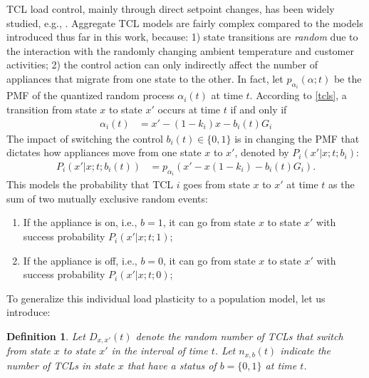 \documentclass[10pt]{IEEEtran}
\newtheorem{definition}[theorem]{Definition}
\begin{document}
TCL load control, mainly through direct setpoint changes, has been widely studied, e.g., \cite{6149125}. Aggregate TCL models are fairly complex compared to the models introduced thus far in this work, because: 1) state transitions are {\it random} due to the interaction with the randomly changing ambient temperature and customer activities; 2)
the control action can only indirectly affect the number of appliances that migrate from one state to the other.   
In fact, let  $p_{\alpha_i}(\alpha;t)$ be the PMF of the quantized random process $\alpha_i(t)$ at time $t$. 
According to \eqref{tcls}, a transition from state $x$ to state $x'$ occurs at time $t$ if and only if
\begin{align}\alpha_i(t)&=x' - (1- k_i) x  - b_i(t) G_i\end{align}
The impact of switching the control $b_i(t)\in\{0,1\}$ is in changing the PMF that dictates how appliances move from one state $x$ to $x'$, denoted by $P_i(x'|x;t;b_i)$:
\begin{align}
P_i(x'|x;t;b_i(t))&=p_{\alpha_i}\left(x'-x(1-k_i)-b_i(t) G_i\right).
\end{align}
This models the probability that TCL $i$ goes from state $x$ to $x'$ at time $t$ as the sum of two mutually exclusive random events:
\begin{enumerate}
\item If the appliance is on, i.e., $b=1$, it can go from state $x$ to state $x'$ with success probability $P_i(x'|x;t;1)$;
\item If the appliance is off, i.e., $b=0$, it can go from state $x$ to state $x'$ with success probability $P_i(x'|x;t;0)$;
\end{enumerate}



To generalize this individual load plasticity to a population model, let us introduce:
\begin{definition}{\it Let
$D_{x,x'}(t)$ denote the random number of TCLs that switch from state $x$ to state $x'$ in the interval of time $t$. 
Let $n_{x,b}(t)$ indicate the number of TCLs in state $x$ that have a status of $b=\{0,1\}$ at time $t$.} 
\end{definition}
\end{document}
